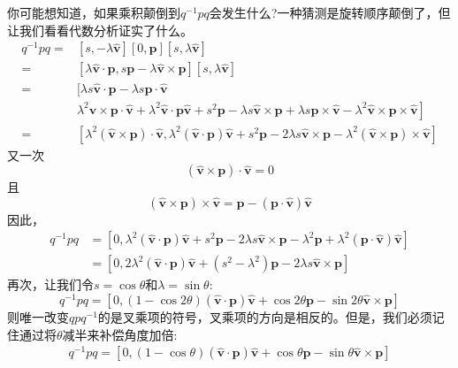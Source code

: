你可能想知道，如果乘积颠倒到$q^{-1} p q$会发生什么?一种猜测是旋转顺序颠倒了，但让我们看看代数分析证实了什么。
$$
\begin{aligned}
q^{-1} p q= & {[s,-\lambda \hat{\mathbf{v}}][0, \mathbf{p}][s, \lambda \hat{\mathbf{v}}] } \\
= & {[\lambda \hat{\mathbf{v}} \cdot \mathbf{p}, s \mathbf{p}-\lambda \hat{\mathbf{v}} \times \mathbf{p}][s, \lambda \hat{\mathbf{v}}] } \\
= & {[\lambda s \hat{\mathbf{v}} \cdot \mathbf{p}-\lambda s \mathbf{p} \cdot \hat{\mathbf{v}}} \\
& \left.\lambda^{2} \hat{\mathbf{v}} \times \mathbf{p} \cdot \hat{\mathbf{v}}+\lambda^{2} \hat{\mathbf{v}} \cdot \mathbf{p} \hat{\mathbf{v}}+s^{2} \mathbf{p}-\lambda s \hat{\mathbf{v}} \times \mathbf{p}+\lambda s \mathbf{p} \times \hat{\mathbf{v}}-\lambda^{2} \hat{\mathbf{v}} \times \mathbf{p} \times \hat{\mathbf{v}}\right] \\
= & {\left[\lambda^{2}(\hat{\mathbf{v}} \times \mathbf{p}) \cdot \hat{\mathbf{v}}, \lambda^{2}(\hat{\mathbf{v}} \cdot \mathbf{p}) \hat{\mathbf{v}}+s^{2} \mathbf{p}-2 \lambda s \hat{\mathbf{v}} \times \mathbf{p}-\lambda^{2}(\hat{\mathbf{v}} \times \mathbf{p}) \times \hat{\mathbf{v}}\right] }
\end{aligned}
$$
又一次
$$
(\hat{\mathbf{v}} \times \mathbf{p}) \cdot \hat{\mathbf{v}}=0
$$
且
$$
(\hat{\mathbf{v}} \times \mathbf{p}) \times \hat{\mathbf{v}}=\mathbf{p}-(\mathbf{p} \cdot \hat{\mathbf{v}}) \hat{\mathbf{v}}
$$
因此，
$$
\begin{aligned}
q^{-1} p q & =\left[0, \lambda^{2}(\hat{\mathbf{v}} \cdot \mathbf{p}) \hat{\mathbf{v}}+s^{2} \mathbf{p}-2 \lambda s \hat{\mathbf{v}} \times \mathbf{p}-\lambda^{2} \mathbf{p}+\lambda^{2}(\mathbf{p} \cdot \hat{\mathbf{v}}) \hat{\mathbf{v}}\right] \\
& =\left[0,2 \lambda^{2}(\hat{\mathbf{v}} \cdot \mathbf{p}) \hat{\mathbf{v}}+\left(s^{2}-\lambda^{2}\right) \mathbf{p}-2 \lambda s \hat{\mathbf{v}} \times \mathbf{p}\right]
\end{aligned}
$$
再次，让我们令$s=\cos \theta$和$\lambda=\sin \theta$:
$$
q^{-1} p q=[0,(1-\cos 2 \theta)(\hat{\mathbf{v}} \cdot \mathbf{p}) \hat{\mathbf{v}}+\cos 2 \theta \mathbf{p}-\sin 2 \theta \hat{\mathbf{v}} \times \mathbf{p}]
$$
则唯一改变$q p q^{-1}$的是叉乘项的符号，叉乘项的方向是相反的。但是，我们必须记住通过将$\theta$减半来补偿角度加倍:
\begin{align}
q^{-1} p q=[0,(1-\cos \theta)(\hat{\mathbf{v}} \cdot \mathbf{p}) \hat{\mathbf{v}}+\cos \theta \mathbf{p}-\sin \theta \hat{\mathbf{v}} \times \mathbf{p}]
\end{align}

